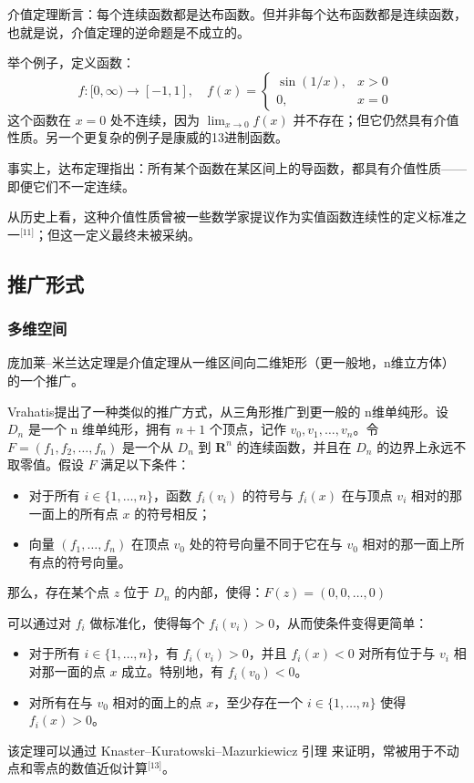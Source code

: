 介值定理断言：每个连续函数都是达布函数。但并非每个达布函数都是连续函数，也就是说，介值定理的逆命题是不成立的。

举个例子，定义函数：
$$
f : [0, \infty) \to [-1, 1], \quad f(x) = \begin{cases}
\sin(1/x), & x > 0 \\
0, & x = 0
\end{cases}~
$$
这个函数在 $x = 0$ 处不连续，因为 $\lim_{x \to 0} f(x)$ 并不存在；但它仍然具有介值性质。另一个更复杂的例子是康威的13进制函数。

事实上，达布定理指出：所有某个函数在某区间上的导函数，都具有介值性质——即便它们不一定连续。

从历史上看，这种介值性质曾被一些数学家提议作为实值函数连续性的定义标准之一\(^\text{[11]}\)；但这一定义最终未被采纳。
\subsection{推广形式}
\subsubsection{多维空间}
庞加莱–米兰达定理是介值定理从一维区间向二维矩形（更一般地，n维立方体）的一个推广。

Vrahatis提出了一种类似的推广方式，从三角形推广到更一般的 n维单纯形。设 $D_n$ 是一个 n 维单纯形，拥有 $n+1$ 个顶点，记作 $v_0, v_1, \dots, v_n$。令 $F = (f_1, f_2, \dots, f_n)$ 是一个从 $D_n$ 到 $\mathbf{R}^n$ 的连续函数，并且在 $D_n$ 的边界上永远不取零值。假设 $F$ 满足以下条件：
\begin{itemize}
\item 对于所有 $i \in \{1, \dots, n\}$，函数 $f_i(v_i)$ 的符号与 $f_i(x)$ 在与顶点 $v_i$ 相对的那一面上的所有点 $x$ 的符号相反；
\item 向量 $(f_1, \dots, f_n)$ 在顶点 $v_0$ 处的符号向量不同于它在与 $v_0$ 相对的那一面上所有点的符号向量。
\end{itemize}
那么，存在某个点 $z$ 位于 $D_n$ 的内部，使得：$F(z) = (0, 0, \dots, 0)$

可以通过对 $f_i$ 做标准化，使得每个 $f_i(v_i) > 0$，从而使条件变得更简单：
\begin{itemize}
\item 对于所有 $i \in \{1, \dots, n\}$，有 $f_i(v_i) > 0$，并且 $f_i(x) < 0$ 对所有位于与 $v_i$ 相对那一面的点 $x$ 成立。特别地，有 $f_i(v_0) < 0$。
\item 对所有在与 $v_0$ 相对的面上的点 $x$，至少存在一个 $i \in \{1, \dots, n\}$ 使得 $f_i(x) > 0$。
\end{itemize}
该定理可以通过 Knaster–Kuratowski–Mazurkiewicz 引理 来证明，常被用于不动点和零点的数值近似计算\(^\text{[13]}\)。

